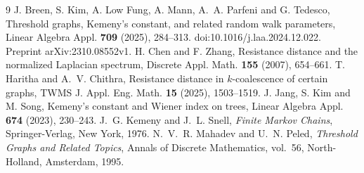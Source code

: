 \documentclass[11pt]{amsart}
\numberwithin{equation}{section}
\begin{document}
\begin{thebibliography}{9}
 J. Breen, S. Kim, A. Low Fung, A. Mann, A.~A. Parfeni
and G. Tedesco, Threshold graphs, Kemeny's constant, and related random
walk parameters, Linear Algebra Appl. \textbf{709} (2025), 284--313.
doi:10.1016/j.laa.2024.12.022. Preprint arXiv:2310.08552v1.
 H. Chen and F. Zhang, Resistance distance and the
normalized Laplacian spectrum, Discrete Appl. Math. \textbf{155}
(2007), 654--661.
 T. Haritha and A.~V. Chithra, Resistance distance in
$k$-coalescence of certain graphs, TWMS J. Appl. Eng. Math.
\textbf{15} (2025), 1503--1519.
 J. Jang, S. Kim and M. Song, Kemeny's constant and
Wiener index on trees, Linear Algebra Appl. \textbf{674} (2023),
230--243.
 J.~G. Kemeny and J.~L. Snell, \emph{Finite Markov
Chains}, Springer-Verlag, New York, 1976.
 N.~V.~R. Mahadev and U.~N. Peled, \emph{Threshold Graphs
and Related Topics}, Annals of Discrete Mathematics, vol.~56,
North-Holland, Amsterdam, 1995.
\end{thebibliography}
\end{document}
